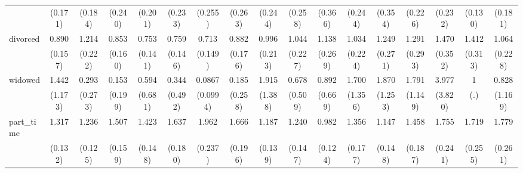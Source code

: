 {\begin{tabular}{l*{16}{c}}
                    &     (0.171)         &     (0.184)         &     (0.240)         &     (0.201)         &     (0.233)         &     (0.255)         &     (0.263)         &     (0.244)         &     (0.258)         &     (0.366)         &     (0.244)         &     (0.354)         &     (0.226)         &     (0.232)         &     (0.130)         &     (0.181)         \\
[1em]
divorced            &       0.890         &       1.214         &       0.853         &       0.753         &       0.759         &       0.713         &       0.882         &       0.996         &       1.044         &       1.138         &       1.034         &       1.249         &       1.291         &       1.470         &       1.412         &       1.064         \\
                    &     (0.157)         &     (0.222)         &     (0.160)         &     (0.141)         &     (0.146)         &     (0.149)         &     (0.176)         &     (0.213)         &     (0.227)         &     (0.269)         &     (0.224)         &     (0.271)         &     (0.293)         &     (0.352)         &     (0.313)         &     (0.228)         \\
[1em]
widowed             &       1.442         &       0.293         &       0.153         &       0.594         &       0.344         &      0.0867\sym{*}  &       0.185         &       1.915         &       0.678         &       0.892         &       1.700         &       1.870         &       1.791         &       3.977         &           1         &       0.828         \\
                    &     (1.173)         &     (0.273)         &     (0.199)         &     (0.681)         &     (0.492)         &    (0.0994)         &     (0.258)         &     (1.388)         &     (0.509)         &     (0.669)         &     (1.356)         &     (1.253)         &     (1.149)         &     (3.820)         &         (.)         &     (1.169)         \\
[1em]
part\_time           &       1.317\sym{**} &       1.236\sym{*}  &       1.507\sym{***}&       1.423\sym{***}&       1.637\sym{***}&       1.962\sym{***}&       1.666\sym{***}&       1.187         &       1.240         &       0.982         &       1.356\sym{*}  &       1.147         &       1.458\sym{**} &       1.755\sym{***}&       1.719\sym{***}&       1.779\sym{***}\\
                    &     (0.132)         &     (0.125)         &     (0.159)         &     (0.148)         &     (0.180)         &     (0.237)         &     (0.196)         &     (0.139)         &     (0.147)         &     (0.124)         &     (0.177)         &     (0.148)         &     (0.187)         &     (0.241)         &     (0.255)         &     (0.261)         \\

\end{tabular}}
